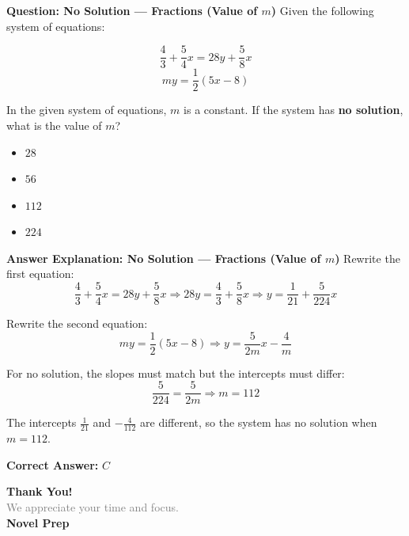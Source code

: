 \documentclass{beamer}
\begin{document}
\begin{frame}{\textbf{Question: No Solution — Fractions (Value of \( m \))}}
Given the following system of equations:

\[
\frac{4}{3} + \frac{5}{4}x = 28y + \frac{5}{8}x
\]
\[
my = \frac{1}{2}(5x - 8)
\]

In the given system of equations, \( m \) is a constant.  
If the system has \textbf{no solution}, what is the value of \( m \)?

\begin{itemize}
    \item[\textbf{A.}] \( 28 \)
    \item[\textbf{B.}] \( 56 \)
    \item[\textbf{C.}] \( 112 \)
    \item[\textbf{D.}] \( 224 \)
\end{itemize}
\end{frame}

\begin{frame}{\textbf{Answer Explanation: No Solution — Fractions (Value of \( m \))}}
Rewrite the first equation:
\[
\frac{4}{3} + \frac{5}{4}x = 28y + \frac{5}{8}x
\Rightarrow 28y = \frac{4}{3} + \frac{5}{8}x
\Rightarrow y = \frac{1}{21} + \frac{5}{224}x
\]

Rewrite the second equation:
\[
my = \frac{1}{2}(5x - 8) \Rightarrow y = \frac{5}{2m}x - \frac{4}{m}
\]

For no solution, the slopes must match but the intercepts must differ:
\[
\frac{5}{224} = \frac{5}{2m} \Rightarrow m = 112
\]

The intercepts \(\frac{1}{21}\) and \(-\frac{4}{112}\) are different, so the system has no solution when \(m = 112\).

\textbf{Correct Answer:} \( \boxed{C} \)
\end{frame}








\begin{frame}{}

    \centering
    \vspace{5em}

    {\Huge \textbf{\textcolor{novelPurple}{Thank You!}}} \\[1em]
    {\large \textcolor{gray}{We appreciate your time and focus.}} \\[3em]

    {\LARGE \textbf{\textcolor{novelPurple}{\textsf{Novel Prep}}}}

    \vfill
\end{frame}
\end{document}
